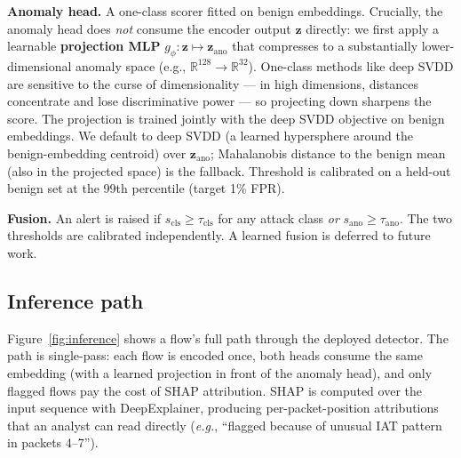 \documentclass[11pt,a4paper]{article}
\begin{document}
\textbf{Anomaly head.} A one-class scorer fitted on benign embeddings. Crucially, the anomaly head does \emph{not} consume the encoder output $\mathbf{z}$ directly: we first apply a learnable \textbf{projection MLP} $g_\phi : \mathbf{z} \mapsto \mathbf{z}_\text{ano}$ that compresses to a substantially lower-dimensional anomaly space (e.g., $\mathbb{R}^{128} \to \mathbb{R}^{32}$). One-class methods like deep SVDD are sensitive to the curse of dimensionality --- in high dimensions, distances concentrate and lose discriminative power --- so projecting down sharpens the score. The projection is trained jointly with the deep SVDD objective on benign embeddings. We default to deep SVDD (a learned hypersphere around the benign-embedding centroid) over $\mathbf{z}_\text{ano}$; Mahalanobis distance to the benign mean (also in the projected space) is the fallback. Threshold is calibrated on a held-out benign set at the 99th percentile (target 1\% FPR).

\textbf{Fusion.} An alert is raised if $s_{\text{cls}} \ge \tau_{\text{cls}}$ for any attack class \emph{or} $s_{\text{ano}} \ge \tau_{\text{ano}}$. The two thresholds are calibrated independently. A learned fusion is deferred to future work.

\subsection{Inference path}
Figure~\ref{fig:inference} shows a flow's full path through the deployed detector. The path is single-pass: each flow is encoded once, both heads consume the same embedding (with a learned projection in front of the anomaly head), and only flagged flows pay the cost of SHAP attribution. SHAP is computed over the input sequence with DeepExplainer, producing per-packet-position attributions that an analyst can read directly (\emph{e.g.}, ``flagged because of unusual IAT pattern in packets 4--7'').
\end{document}
